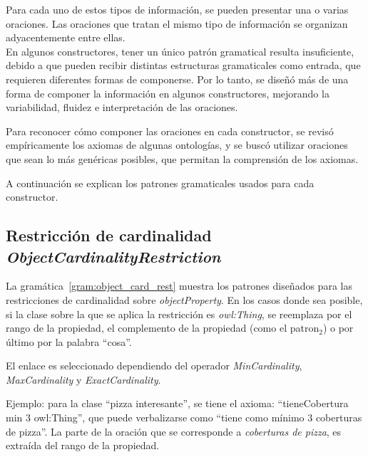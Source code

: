 Para cada uno de estos tipos de información, se pueden presentar una o varias oraciones. Las oraciones que tratan el mismo tipo de información se organizan adyacentemente entre ellas.
\\

En algunos constructores, tener un único patrón gramatical resulta insuficiente, debido a que pueden recibir distintas estructuras gramaticales como entrada, que requieren diferentes formas de componerse. Por lo tanto, se diseñó más de una forma de componer la información en algunos constructores, mejorando la variabilidad, fluidez e interpretación de las oraciones. 

Para reconocer cómo componer las oraciones en cada constructor, se revisó empíricamente los axiomas de algunas ontologías, y se buscó utilizar oraciones que sean lo más genéricas posibles, que permitan la comprensión de los axiomas. 

A continuación se explican los patrones gramaticales usados para cada constructor. %

\subsection{Restricción de cardinalidad \emph{ObjectCardinalityRestriction}}

La gramática~\ref{gram:object_card_rest} muestra los patrones diseñados para las restricciones de cardinalidad sobre \emph{objectProperty}. En los casos donde sea posible, si la clase sobre la que se aplica la restricción es \emph{owl:Thing}, se reemplaza por el rango de la propiedad, el complemento de la propiedad (como el patron$_2$) o por último por la palabra ``cosa''.

El enlace es seleccionado dependiendo del operador \emph{MinCardinality}, \emph{MaxCardinality} y \emph{ExactCardinality}.

Ejemplo: para la clase ``pizza interesante'', se tiene el axioma: ``tieneCobertura min 3 owl:Thing'', que puede verbalizarse como ``tiene como mínimo 3 coberturas de pizza''. La parte de la oración que se corresponde a \emph{coberturas de pizza}, es extraída del rango de la propiedad.

